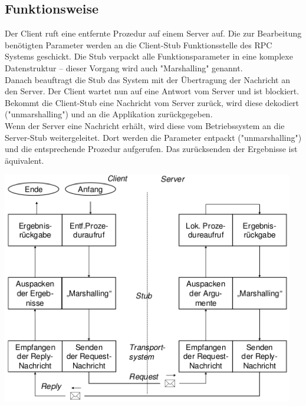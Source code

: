 \documentclass[10pt]{article}
\begin{document}
\subsection{Funktionsweise}
Der Client ruft eine entfernte Prozedur auf einem Server auf. Die zur Bearbeitung benötigten Parameter werden an die Client-Stub Funktionsstelle des RPC Systems geschickt. Die Stub verpackt alle Funktionsparameter in eine komplexe Datenstruktur – dieser Vorgang wird auch "Marshalling" genannt. \\
Danach beauftragt die Stub das System mit der Übertragung der Nachricht an den Server. Der Client wartet nun auf eine Antwort vom Server und ist blockiert. Bekommt die Client-Stub eine Nachricht vom Server zurück, wird diese dekodiert ("unmarshalling") und an die Applikation zurückgegeben. \\
Wenn der Server eine Nachricht erhält, wird diese vom Betriebssystem an die Server-Stub weitergeleitet. Dort werden die Parameter entpackt ("unmarshalling") und die entsprechende Prozedur aufgerufen. Das zurücksenden der Ergebnisse ist äquivalent.
\begin{center}
	\includegraphics[scale=0.5]{rpc-funktionsweise.png}\\
\end{center}
\end{document}

